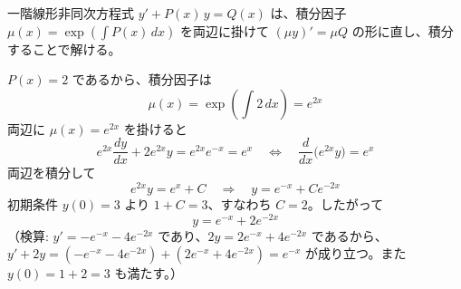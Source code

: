 
一階線形非同次方程式 $y' + P(x)\,y = Q(x)$ は、積分因子 $\mu(x) = \exp\left(\int P(x)\,dx\right)$ を両辺に掛けて $(\mu y)' = \mu Q$ の形に直し、積分することで解ける。

$P(x) = 2$ であるから、積分因子は
\[
\mu(x) = \exp\left(\int 2\,dx\right) = e^{2x}
\]
両辺に $\mu(x) = e^{2x}$ を掛けると
\[
e^{2x}\frac{dy}{dx} + 2e^{2x}y = e^{2x}e^{-x} = e^{x}
\quad\Longleftrightarrow\quad
\frac{d}{dx}\bigl(e^{2x}y\bigr) = e^{x}
\]
両辺を積分して
\[
e^{2x}y = e^{x} + C
\quad\Longrightarrow\quad
y = e^{-x} + Ce^{-2x}
\]
初期条件 $y(0) = 3$ より $1 + C = 3$、すなわち $C = 2$。したがって
\[
\boxed{\; y = e^{-x} + 2e^{-2x} \;}
\]
（検算: $y' = -e^{-x} - 4e^{-2x}$ であり、$2y = 2e^{-x} + 4e^{-2x}$ であるから、$y' + 2y = (-e^{-x}-4e^{-2x}) + (2e^{-x}+4e^{-2x}) = e^{-x}$ が成り立つ。また $y(0) = 1 + 2 = 3$ も満たす。）
